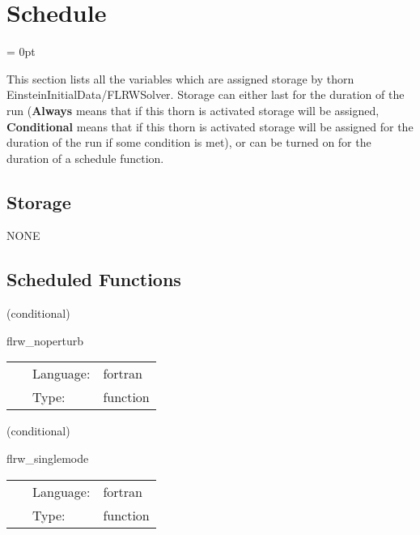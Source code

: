 
\section{Schedule} 


\parskip = 0pt


\noindent This section lists all the variables which are assigned storage by thorn EinsteinInitialData/FLRWSolver.  Storage can either last for the duration of the run ({\bf Always} means that if this thorn is activated storage will be assigned, {\bf Conditional} means that if this thorn is activated storage will be assigned for the duration of the run if some condition is met), or can be turned on for the duration of a schedule function.


\subsection*{Storage}NONE
\subsection*{Scheduled Functions}
\vspace{5mm}

   (conditional) 

\hspace{5mm} flrw\_noperturb 

\hspace{5mm}{\it sets up initial data for flrw spacetime } 


\hspace{5mm}

 \begin{tabular*}{160mm}{cll} 
~ & Language:  & fortran \\ 
~ & Type:  & function \\ 
\end{tabular*} 


\vspace{5mm}

   (conditional) 

\hspace{5mm} flrw\_singlemode 

\hspace{5mm}{\it sets up initial data for a single-mode perturbation to flrw spacetime } 


\hspace{5mm}

 \begin{tabular*}{160mm}{cll} 
~ & Language:  & fortran \\ 
~ & Type:  & function \\ 
\end{tabular*} 


